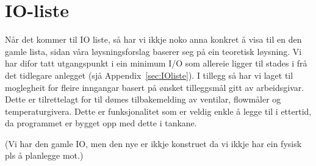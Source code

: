 \section{IO-liste}
\thispagestyle{fancy}

Når det kommer til \gls{IO} liste, så har vi ikkje noko anna konkret å visa til en den gamle lista, sidan våra løysningsforslag baserer seg på ein teoretisk løysning. 
Vi har difor tatt utgangspunkt i ein minimum I/O som allereie ligger til stades i frå det tidlegare anlegget (sjå Appendix~\ref{sec:IOliste}). 
I tillegg så har vi laget til moglegheit for fleire inngangar basert på ønsket tilleggsmål gitt av arbeidsgivar. 
Dette er tilrettelagt for til dømes tilbakemelding av ventilar, flowmåler og temperaturgivera.
Dette er funksjonalitet som er veldig enkle å legge til i ettertid, da programmet er bygget opp med dette i tankane.

\newpage

(Vi har den gamle IO, men den nye er ikkje konstruet da vi ikkje har ein fysisk pls å planlegge mot.)